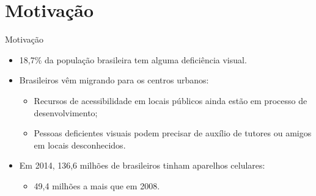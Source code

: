 \section{Motivação}\label{sec:intro}
\begin{frame}[allowframebreaks]{Motivação}
	\begin{itemize}
		\setlength{\itemsep}{0.5em}
		\item<1-> 18,7\% da população brasileira tem alguma deficiência visual.
		
		\item<1-> Brasileiros vêm migrando para os centros urbanos:
		\begin{itemize}
			\setlength{\itemsep}{0.5em}
			\item<1-> Recursos de acessibilidade em locais públicos ainda estão em processo de desenvolvimento;
			\item<1-> Pessoas deficientes visuais podem precisar de auxílio de tutores ou amigos em locais desconhecidos.
		\end{itemize}
		
		\item<1-> Em 2014, 136,6 milhões de brasileiros tinham aparelhos celulares:
			\begin{itemize}
				\item<1-> 49,4 milhões a mais que em 2008.
			\end{itemize}
	\end{itemize}
\end{frame}